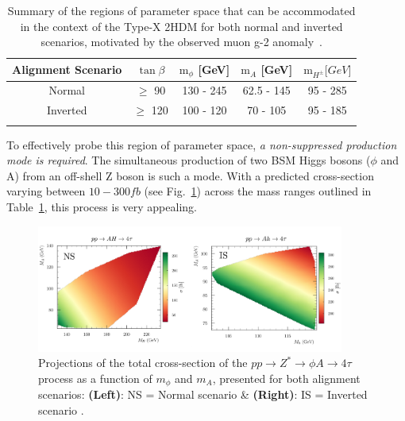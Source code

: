 \begin{table}[!htbp]
\centering
\renewcommand{\arraystretch}{1.5} %
\setlength{\tabcolsep}{12pt} %
\begin{tabular}{|c|c|c|c|c|}
\hline
Alignment Scenario & $\tan{\beta}$ & $\text{m}_\phi$ {[}GeV{]} & $\text{m}_A$ {[}GeV{]} & $\text{m}_{H^\pm} {[}GeV{]}$ \\ \hline \hline
Normal             & $\geq$ 90     & 130 - 245                 & 62.5 - 145             & 95 - 285                     \\ \arrayrulecolor{lightgray} \hline
Inverted           & $\geq$ 120    & 100 - 120                 & 70 - 105               & 95 - 185 \\ \arrayrulecolor{black} \hline
\end{tabular}
\caption[Allowed parameter space for Type-X Two-Higgs Doublet Model scenarios accommodating the muon g-2]{Summary of the regions of parameter space that can be accommodated in the context of the Type-X 2HDM for both normal and inverted scenarios, motivated by the observed muon g-2 anomaly~\cite{TypeX_2HDM}.}
\label{Table:Chapter2_TypeX-ParameterSpace}
\end{table}

To effectively probe this region of parameter space, \textit{a non-suppressed production mode is required}. The simultaneous production of two \ac{BSM} Higgs bosons ($\phi$ and A) from an off-shell Z boson is such a mode. With a predicted cross-section varying between $10-300\unit{fb}$ (see Fig.~\ref{Figure:Chapter2_4tau_ProductionXS}) across the mass ranges outlined in Table~\ref{Table:Chapter2_TypeX-ParameterSpace}, this process is very appealing. 

\begin{figure}[!htbp]
\centering
    \includegraphics[width= 0.9\textwidth]{Figures/Chapter2/4tau_Production_XS.pdf}
    \caption[Projections of the total cross-section of the $pp \to Z^* \to \phi A \to 4\tau$ process]{Projections of the total cross-section of the $pp \to Z^* \to \phi A \to 4\tau$ process as a function of $m_\phi$ and $m_A$, presented for both alignment scenarios: \textbf{(Left)}: NS = Normal scenario \& \textbf{(Right)}: IS = Inverted scenario \cite{TypeX_2HDM}.}
    \label{Figure:Chapter2_4tau_ProductionXS}
\end{figure}

